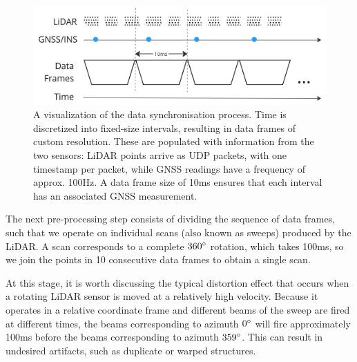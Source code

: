 \begin{figure}
    \centering
    \includegraphics[width=0.7\linewidth]{images/data_sync.jpg}
    \caption[Data frame synchronisation]{A visualization of the data synchronisation process. Time is discretized into fixed-size intervals, resulting in data frames of custom resolution. These are populated with information from the two sensors: LiDAR points arrive as UDP packets, with one timestamp per packet, while GNSS readings have a frequency of approx. 100Hz. A data frame size of 10ms ensures that each interval has an associated GNSS measurement.}
    \label{fig:data-sync}
\end{figure}

The next pre-processing step consists of dividing the sequence of data frames, such that we operate on individual scans (also known as sweeps) produced by the LiDAR. A scan corresponds to a complete $360 \degree$ rotation, which takes 100ms, so we join the points in 10 consecutive data frames to obtain a single scan.

At this stage, it is worth discussing the typical distortion effect that occurs when a rotating LiDAR sensor is moved at a relatively high velocity. Because it operates in a relative coordinate frame and different beams of the sweep are fired at different times, the beams corresponding to azimuth $0 \degree$ will fire approximately 100ms before the beams corresponding to azimuth $359 \degree$. This can result in undesired artifacts, such as duplicate or warped structures. 



